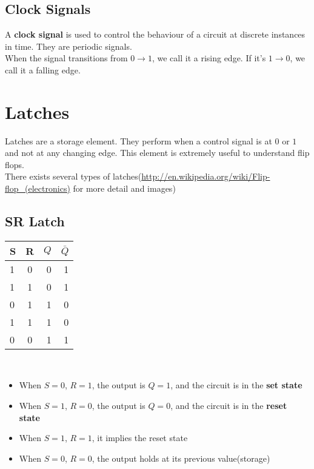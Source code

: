 \documentclass[12pt]{report}
\begin{document}
	 	\subsection{Clock Signals}
	 		A \textbf{clock signal} is used to control the behaviour of a circuit at discrete instances in time. They are periodic signals. \\
	 		When the signal transitions from $0 \rightarrow 1$, we call it a rising edge. If it's $1 \rightarrow 0$, we call it a falling edge.
	 \section{Latches}
	 	Latches are a storage element. They perform when a control signal is at $0$ or $1$ and not at any changing edge. This element is extremely useful to understand flip flops.\\
	 	There exists several types of latches(\url{http://en.wikipedia.org/wiki/Flip-flop_(electronics)} for more detail and images)
	 	\subsection{SR Latch}
			\begin{tabular}{ l | c || r | r }
				S & R & $Q$ & $\bar{Q}$\\
				\hline
				1 & 0 & 0 & 1 \\
				1 & 1 & 0 & 1 \\
				0 & 1 & 1 & 0 \\
				1 & 1 & 1 & 0 \\
				0 & 0 & 1 & 1 \\
			\end{tabular}
			\\
			\begin{itemize}
			\item When $S = 0$, $R=1$, the output is $Q = 1$, and the circuit is in the \textbf{set state}
			\item When $S = 1$, $R=0$, the output is $Q = 0$, and the circuit is in the \textbf{reset state}
			\item When $S = 1$, $R = 1$, it implies the reset state
			\item When $S = 0$, $R = 0$, the output holds at its previous value(storage)
			\end{itemize}
\end{document}
